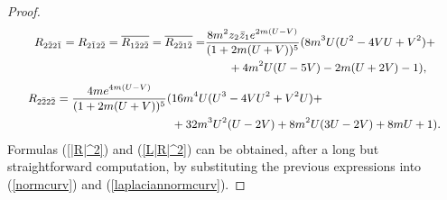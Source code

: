 \documentclass[11pt, reqno]{amsart}
\begin{document}
\begin{proof}
\begin{equation}
{\small\begin{split}
R_{2\bar 2 2\bar 1}=R_{2\bar 1 2\bar 2}=\overline{R_{1\bar 2 2\bar 2}}=\overline{R_{2\bar 2 1\bar 2}}=&\frac{8 m^2z_2\bar z_1e^{2m(U-V)}}{(1+2m(U+V))^5}(8m^3U(U^2-4VU+V^2)+\\
&\quad \quad+4m^2U(U-5V)-2m(U+2V)-1),
\end{split} }\nonumber
\end{equation}
 \begin{equation}
{\small\begin{split}
R_{2\bar 2 2\bar 2}=\frac{4me^{4m(U-V)}}{(1+2m(U+V))^5}(&16m^4U(U^3-4VU^2+V^2U)+\\
&+32m^3U^2(U-2V)+8m^2U(3U-2V)+8mU+1).
\end{split} \nonumber}
\end{equation}
Formulas  (\ref{|R|^2})  and (\ref{L|R|^2})  can be obtained, after a long but straightforward computation,  by substituting
the previous expressions into (\ref{normcurv}) and (\ref{laplaciannormcurv}).
\end{proof}
\end{document}
